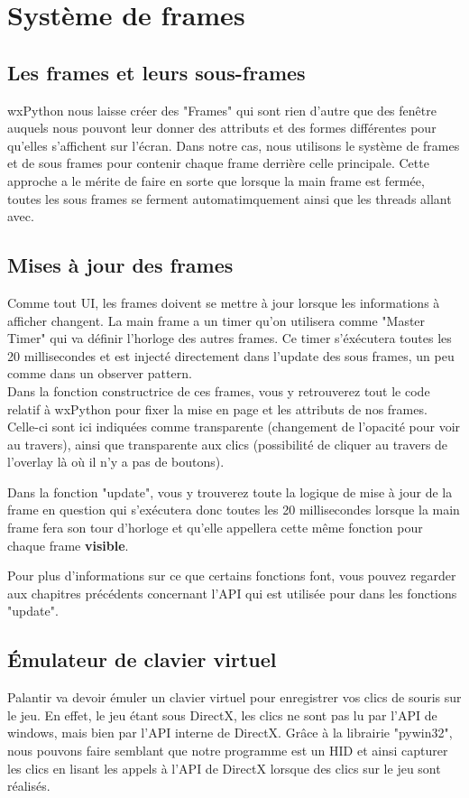 
\section{Système de frames}
\subsection{Les frames et leurs sous-frames}
wxPython nous laisse créer des "Frames" qui sont rien d'autre que des fenêtre auquels nous pouvont leur donner des attributs et des formes différentes pour qu'elles s'affichent sur l'écran. Dans notre cas, nous utilisons le système de frames et de sous frames pour contenir chaque frame derrière celle principale. Cette approche a le mérite de faire en sorte que lorsque la main frame est fermée, toutes les sous frames se ferment automatimquement ainsi que les threads allant avec.

\subsection{Mises à jour des frames}
Comme tout UI, les frames doivent se mettre à jour lorsque les informations à afficher changent. La main frame a un timer qu'on utilisera comme "Master Timer" qui va définir l'horloge des autres frames. Ce timer s'éxécutera toutes les 20 millisecondes et est injecté directement dans l'update des sous frames, un peu comme dans un observer pattern.\\

Dans la fonction constructrice de ces frames, vous y retrouverez tout le code relatif à wxPython pour fixer la mise en page et les attributs de nos frames. Celle-ci sont ici indiquées comme transparente (changement de l'opacité pour voir au travers), ainsi que transparente aux clics (possibilité de cliquer au travers de l'overlay là où il n'y a pas de boutons).

Dans la fonction "update", vous y trouverez toute la logique de mise à jour de la frame en question qui s'exécutera donc toutes les 20 millisecondes lorsque la main frame fera son tour d'horloge et qu'elle appellera cette même fonction pour chaque frame \textbf{visible}.

Pour plus d'informations sur ce que certains fonctions font, vous pouvez regarder aux chapitres précédents concernant l'API qui est utilisée pour dans les fonctions "update".

\subsection{Émulateur de clavier virtuel}
Palantir va devoir émuler un clavier virtuel pour enregistrer vos clics de souris sur le jeu. En effet, le jeu étant sous DirectX, les clics ne sont pas lu par l'API de windows, mais bien par l'API interne de DirectX. Grâce à la librairie "pywin32", nous pouvons faire semblant que notre programme est un HID et ainsi capturer les clics en lisant les appels à l'API de DirectX lorsque des clics sur le jeu sont réalisés.\\


